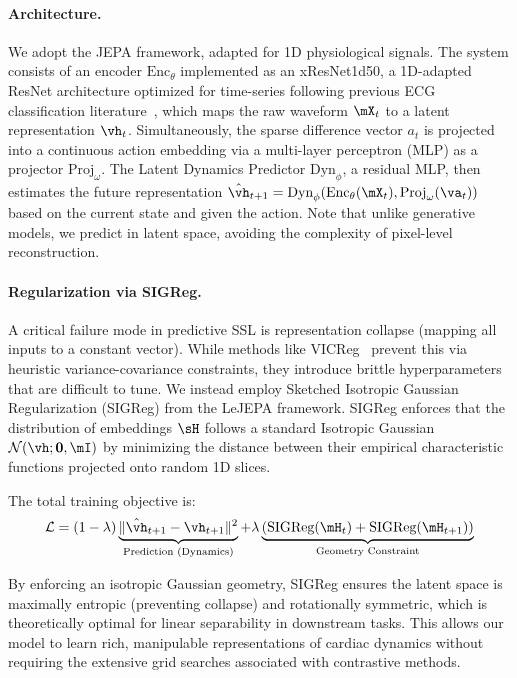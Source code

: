 \paragraph{Architecture.}
We adopt the JEPA framework, adapted for 1D physiological signals. The system consists of an encoder $\text{Enc}_\theta$ implemented as an xResNet1d50, a 1D-adapted ResNet architecture optimized for time-series following previous ECG classification literature~\citep{strodthoff2024prospects}, which maps the raw waveform $\mX_t$ to a latent representation $\vh_t$. Simultaneously, the sparse difference vector $a_t$ is projected into a continuous action embedding via a multi-layer perceptron (MLP) as a projector $\text{Proj}_\omega$. The Latent Dynamics Predictor $\text{Dyn}_\phi$, a residual MLP, then estimates the future representation $\hat{\vh}_{t+1} = \text{Dyn}_\phi(\text{Enc}_\theta(\mX_t), \text{Proj}_\omega(\va_t))$ based on the current state and given the action. Note that unlike generative models, we predict in latent space, avoiding the complexity of pixel-level reconstruction.

\paragraph{Regularization via SIGReg.}
A critical failure mode in predictive SSL is representation collapse (mapping all inputs to a constant vector). While methods like VICReg~\citep{bardes2021vicreg} prevent this via heuristic variance-covariance constraints, they introduce brittle hyperparameters that are difficult to tune. We instead employ Sketched Isotropic Gaussian Regularization (SIGReg) from the LeJEPA framework. SIGReg enforces that the distribution of embeddings $\sH$ follows a standard Isotropic Gaussian $\mathcal{N}(\vh;\mathbf{0}, \mI)$ by minimizing the distance between their empirical characteristic functions projected onto random 1D slices.

The total training objective is:
$$ \mathcal{L} = (1-\lambda) \underbrace{\| \hat{\vh}_{t+1} - \vh_{t+1} \|^2}_{\text{Prediction (Dynamics)}} + \lambda \underbrace{(\text{SIGReg}(\mH_t) + \text{SIGReg}(\mH_{t+1}))}_{\text{Geometry Constraint}} $$

By enforcing an isotropic Gaussian geometry, SIGReg ensures the latent space is maximally entropic (preventing collapse) and rotationally symmetric, which is theoretically optimal for linear separability in downstream tasks. This allows our model to learn rich, manipulable representations of cardiac dynamics without requiring the extensive grid searches associated with contrastive methods.

